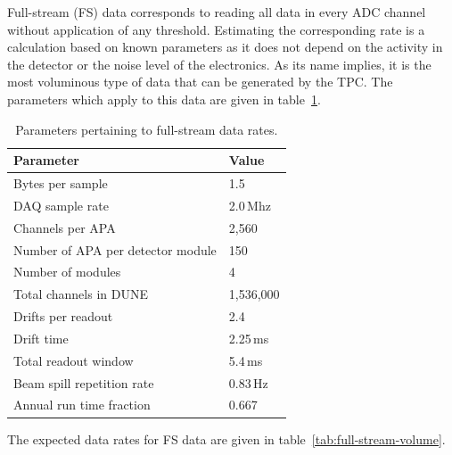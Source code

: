 Full-stream (FS) data corresponds to reading all data in every ADC channel without
application of any threshold. Estimating the corresponding rate is a calculation based on
known parameters as it does not depend on the activity in the detector or the noise
level of the electronics. As its name implies, it is the most voluminous type of data
that can be generated by the TPC. The parameters which apply to this data are given in
table~\ref{tab:full-stream-parameters}.

\begin{table}[ht!]
	\centering
	\begin{tabular}{| p{3in} | p{1.1in} |}
		\hline

	\textbf{Parameter} & \textbf{Value} \\ \hline
	
	Bytes per sample & 1.5 \\ \hline
	
	DAQ sample rate & 2.0\,Mhz \\ \hline
	
	Channels per APA & 2,560 \\ \hline
	
	Number of APA per detector module & 150 \\ \hline
	
	Number of modules & 4 \\ \hline
	
	Total channels in DUNE & 1,536,000 \\ \hline \hline
	
	Drifts per readout & 2.4 \\ \hline
	
	Drift time & 2.25\,ms \\ \hline

	Total readout window & 5.4\,ms \\ \hline \hline
	
	Beam spill repetition rate & 0.83\,Hz \\ \hline
	
	Annual run time fraction & 0.667 \\ \hline
	\end{tabular}
	\caption{Parameters pertaining to full-stream data rates.}
	\label{tab:full-stream-parameters}
\end{table}
The expected data rates for FS data are given
in table~\ref{tab:full-stream-volume}.
